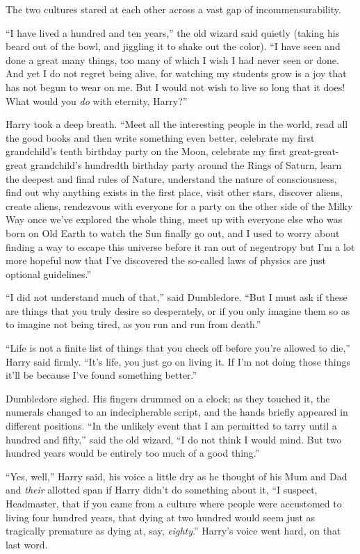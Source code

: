 The two cultures stared at each other across a vast gap of incommensurability.

``I have lived a hundred and ten years,'' the old wizard said quietly (taking his beard out of the bowl, and jiggling it to shake out the color). ``I have seen and done a great many things, too many of which I wish I had never seen or done. And yet I do not regret being alive, for watching my students grow is a joy that has not begun to wear on me. But I would not wish to live so long that it does! What would you \emph{do} with eternity, Harry?''

Harry took a deep breath. ``Meet all the interesting people in the world, read all the good books and then write something even better, celebrate my first grandchild's tenth birthday party on the Moon, celebrate my first great-great-great grandchild's hundredth birthday party around the Rings of Saturn, learn the deepest and final rules of Nature, understand the nature of consciousness, find out why anything exists in the first place, visit other stars, discover aliens, create aliens, rendezvous with everyone for a party on the other side of the Milky Way once we've explored the whole thing, meet up with everyone else who was born on Old Earth to watch the Sun finally go out, and I used to worry about finding a way to escape this universe before it ran out of negentropy but I'm a lot more hopeful now that I've discovered the so-called laws of physics are just optional guidelines.''

``I did not understand much of that,'' said Dumbledore. ``But I must ask if these are things that you truly desire so desperately, or if you only imagine them so as to imagine not being tired, as you run and run from death.''

``Life is not a finite list of things that you check off before you're allowed to die,'' Harry said firmly. ``It's life, you just go on living it. If I'm not doing those things it'll be because I've found something better.''

Dumbledore sighed. His fingers drummed on a clock; as they touched it, the numerals changed to an indecipherable script, and the hands briefly appeared in different positions. ``In the unlikely event that I am permitted to tarry until a hundred and fifty,'' said the old wizard, ``I do not think I would mind. But two hundred years would be entirely too much of a good thing.''

``Yes, well,'' Harry said, his voice a little dry as he thought of his Mum and Dad and \emph{their} allotted span if Harry didn't do something about it, ``I suspect, Headmaster, that if you came from a culture where people were accustomed to living four hundred years, that dying at two hundred would seem just as tragically premature as dying at, say, \emph{eighty}.'' Harry's voice went hard, on that last word.

